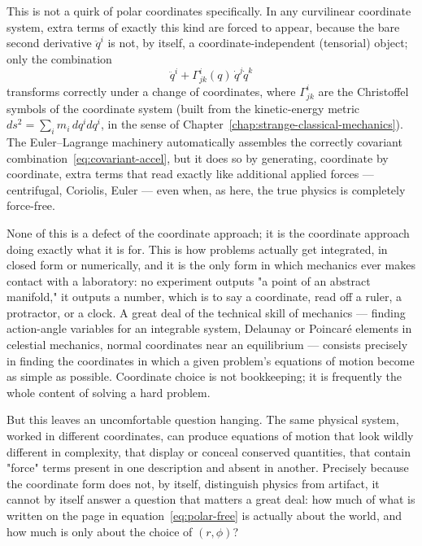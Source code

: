 This is not a quirk of polar coordinates specifically. In any
curvilinear coordinate system, extra terms of exactly this kind are
forced to appear, because the bare second derivative $\ddot q^i$ is
not, by itself, a coordinate-independent (tensorial) object; only the
combination
\begin{equation}
  \ddot q^i + \Gamma^i_{jk}(q)\,\dot q^j\dot q^k
  \label{eq:covariant-accel}
\end{equation}
transforms correctly under a change of coordinates, where
$\Gamma^i_{jk}$ are the Christoffel symbols of the coordinate system
(built from the kinetic-energy metric $ds^2 = \sum_i m_i\,dq^i
dq^i$, in the sense of Chapter~\ref{chap:strange-classical-mechanics}).
The Euler--Lagrange machinery automatically assembles the correctly
covariant combination~\eqref{eq:covariant-accel}, but it does so by
generating, coordinate by coordinate, extra terms that read exactly
like additional applied forces --- centrifugal, Coriolis, Euler ---
even when, as here, the true physics is completely force-free.

None of this is a defect of the coordinate approach; it is the
coordinate approach doing exactly what it is for. This is how
problems actually get integrated, in closed form or numerically, and
it is the only form in which mechanics ever makes contact with a
laboratory: no experiment outputs "a point of an abstract manifold,"
it outputs a number, which is to say a coordinate, read off a ruler,
a protractor, or a clock. A great deal of the technical skill of
mechanics --- finding action-angle variables for an integrable
system, Delaunay or Poincar\'e elements in celestial mechanics,
normal coordinates near an equilibrium --- consists precisely in
finding the coordinates in which a given problem's equations of
motion become as simple as possible. Coordinate choice is not
bookkeeping; it is frequently the whole content of solving a hard
problem.

But this leaves an uncomfortable question hanging. The same physical
system, worked in different coordinates, can produce equations of
motion that look wildly different in complexity, that display or
conceal conserved quantities, that contain "force" terms present in
one description and absent in another. Precisely because the
coordinate form does not, by itself, distinguish physics from
artifact, it cannot by itself answer a question that matters a great
deal: how much of what is written on the page in
equation~\eqref{eq:polar-free} is actually about the world, and how
much is only about the choice of $(r,\phi)$?

